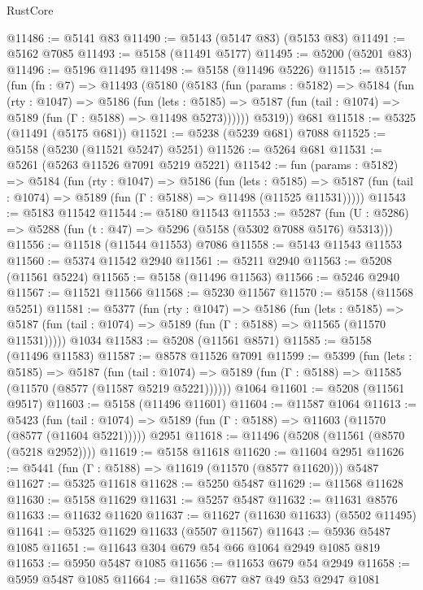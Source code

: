 \begin{lexlean}{RustCore}
\begin{coremodule}
@11486 := @5141 @83
@11490 := @5143 (@5147 @83) (@5153 @83)
@11491 := @5162 @7085
@11493 := @5158 (@11491 @5177)
@11495 := @5200 (@5201 @83)
@11496 := @5196 @11495
@11498 := @5158 (@11496 @5226)
@11515 := @5157
    (fun (fn : @7) =>
    @11493
      (@5180
        (@5183
          (fun (params : @5182) =>
          @5184
            (fun (rty : @1047) =>
            @5186
              (fun (lets : @5185) =>
              @5187 (fun (tail : @1074) => @5189 (fun (Γ : @5188) => @11498 @5273))))))
        @5319))
    @681
@11518 := @5325 (@11491 (@5175 @681))
@11521 := @5238 (@5239 @681) @7088
@11525 := @5158 (@5230 (@11521 @5247) @5251)
@11526 := @5264 @681
@11531 := @5261 (@5263 @11526 @7091 @5219 @5221)
@11542 := fun (params : @5182) =>
  @5184
    (fun (rty : @1047) =>
    @5186
      (fun (lets : @5185) =>
      @5187 (fun (tail : @1074) => @5189 (fun (Γ : @5188) => @11498 (@11525 @11531)))))
@11543 := @5183 @11542
@11544 := @5180 @11543
@11553 := @5287
    (fun (U : @5286) => @5288 (fun (t : @47) => @5296 (@5158 (@5302 @7088 @5176) @5313)))
@11556 := @11518 (@11544 @11553) @7086
@11558 := @5143 @11543 @11553
@11560 := @5374 @11542 @2940
@11561 := @5211 @2940
@11563 := @5208 (@11561 @5224)
@11565 := @5158 (@11496 @11563)
@11566 := @5246 @2940
@11567 := @11521 @11566
@11568 := @5230 @11567
@11570 := @5158 (@11568 @5251)
@11581 := @5377
    (fun (rty : @1047) =>
    @5186
      (fun (lets : @5185) =>
      @5187 (fun (tail : @1074) => @5189 (fun (Γ : @5188) => @11565 (@11570 @11531)))))
    @1034
@11583 := @5208 (@11561 @8571)
@11585 := @5158 (@11496 @11583)
@11587 := @8578 @11526 @7091
@11599 := @5399
    (fun (lets : @5185) =>
    @5187
      (fun (tail : @1074) =>
      @5189 (fun (Γ : @5188) => @11585 (@11570 (@8577 (@11587 @5219 @5221))))))
    @1064
@11601 := @5208 (@11561 @9517)
@11603 := @5158 (@11496 @11601)
@11604 := @11587 @1064
@11613 := @5423
    (fun (tail : @1074) => @5189 (fun (Γ : @5188) => @11603 (@11570 (@8577 (@11604 @5221)))))
    @2951
@11618 := @11496 (@5208 (@11561 (@8570 (@5218 @2952))))
@11619 := @5158 @11618
@11620 := @11604 @2951
@11626 := @5441 (fun (Γ : @5188) => @11619 (@11570 (@8577 @11620))) @5487
@11627 := @5325 @11618
@11628 := @5250 @5487
@11629 := @11568 @11628
@11630 := @5158 @11629
@11631 := @5257 @5487
@11632 := @11631 @8576
@11633 := @11632 @11620
@11637 := @11627 (@11630 @11633) (@5502 @11495)
@11641 := @5325 @11629 @11633 (@5507 @11567)
@11643 := @5936 @5487 @1085
@11651 := @11643 @304 @679 @54 @66 @1064 @2949 @1085 @819
@11653 := @5950 @5487 @1085
@11656 := @11653 @679 @54 @2949
@11658 := @5959 @5487 @1085
@11664 := @11658 @677 @87 @49 @53 @2947 @1081

\end{coremodule}
\end{lexlean}
